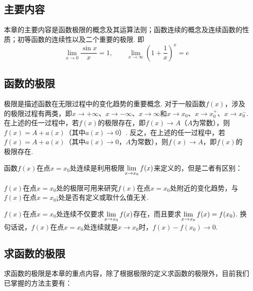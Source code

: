 \subsection{主要内容}
本章的主要内容是函数极限的概念及其运算法则；函数连续的概念及连续函数的性质；初等函数的连续性以及二个重要的极限. 即
\[\lim_{x\to 0}\frac{\sin x}{x}=1,\qquad \lim_{x\to \infty}\left(1+\frac{1}{x}\right)^x=e\]


\subsection{函数的极限}
极限是描述函数在无限过程中的变化趋势的重要概念. 对于一般函数$f(x)$，涉及的极限过程有两类，即$x\to +\infty$、$x\to-\infty$、$x\to \infty$和$x\to x_0$、$x\to x_0^+$、$x\to x_0^-$. 在上述的任一过程中，若$f(x)$的极限存在，即$f(x)\to A$（$A$为常数），则$f(x)=A+a(x)$（其中$a(x)\to 0$）. 反之，在上述的任一过程中，若$f(x)
=A+a(x)$（其中$a(x)\to 0$，$A$为常数），则$f(x)\to A$，即$f(x)$的极限存在.

函数$f(x)$在点$x=x_0$处连续是利用极限$\lim\limits_{x\to x_0}f(x)$来定义的，但是二者有区别：

$f(x)$在点$x=x_0$处的极限可用来研究$f(x)$在点$x=x_0$处附近的变化趋势，与$f(x)$在点$x=x_0$¡处是否有定义或取什么值无关.

$f(x)$在点$x=x_0$处连续不仅要求$\lim\limits_{x\to x_0}f(x)$存在，而且要求$\lim\limits_{x\to x_0}f(x)=f(x_0)$. 换句话说，$f(x)$在点$x=x_0$处连续就是$x\to x_0$时，$f(x)-f(x_0)\to 0$.

\subsection{求函数的极限}
求函数的极限是本章的重点内容，除了根据极限的定义求函数的极限外，目前我们已掌握的方法主要有：

